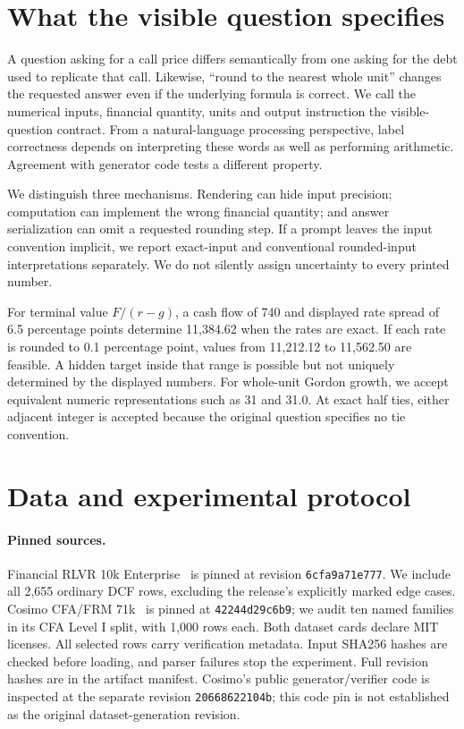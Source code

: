 \section{What the visible question specifies}
A question asking for a call price differs semantically from one asking for the debt used to replicate that call. Likewise, ``round to the nearest whole unit'' changes the requested answer even if the
underlying formula is correct. We call the numerical inputs, financial quantity, units and output instruction the visible-question contract. From a natural-language processing perspective, label correctness
depends on interpreting these words as well as performing arithmetic. Agreement with generator code tests a different property.

We distinguish three mechanisms. Rendering can hide input precision; computation can implement the wrong financial quantity; and answer serialization can omit a requested rounding step. If a prompt leaves the
input convention implicit, we report exact-input and conventional rounded-input interpretations separately. We do not silently assign uncertainty to every printed number.

For terminal value $F/(r-g)$, a cash flow of 740 and displayed rate spread of 6.5 percentage points determine 11,384.62 when the rates are exact. If each rate is rounded to 0.1 percentage point, values from
11,212.12 to 11,562.50 are feasible. A hidden target inside that range is possible but not uniquely determined by the displayed numbers. For whole-unit Gordon growth, we accept equivalent numeric
representations such as 31 and 31.0. At exact half ties, either adjacent integer is accepted because the original question specifies no tie convention.

\section{Data and experimental protocol}
\paragraph{Pinned sources.} Financial RLVR 10k Enterprise~\cite{rlvr} is pinned at revision
\texttt{6cfa9a71e777}. We include all 2,655 ordinary DCF rows, excluding the
release's explicitly marked edge cases. Cosimo CFA/FRM 71k~\cite{cosimo} is pinned at
\texttt{42244d29c6b9}; we audit ten named families in its CFA Level I split,
with 1,000 rows each. Both dataset cards declare MIT licenses. All selected rows carry verification metadata. Input SHA256 hashes are checked before loading, and parser failures stop the experiment. Full
revision hashes are in the artifact manifest.
Cosimo's public generator/verifier code is inspected at the separate revision
\texttt{20668622104b}; this code pin is not established as the original dataset-generation revision.

